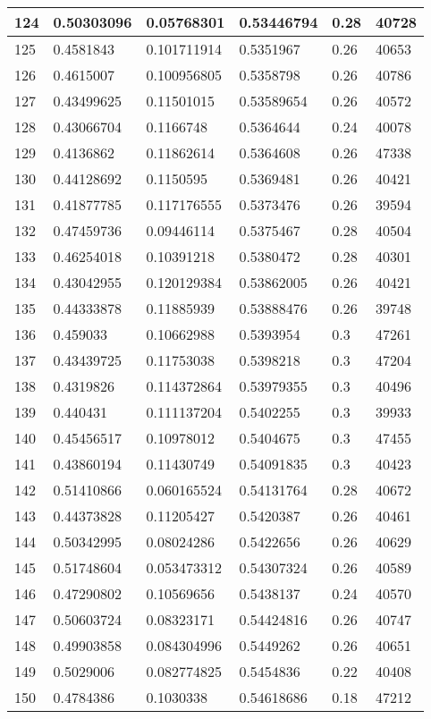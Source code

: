 \begin{longtable}{|l|l|l|l|l|l|}
124 & 0.50303096 & 0.05768301 & 0.53446794 & 0.28 & 40728 \\ \hline 
125 & 0.4581843 & 0.101711914 & 0.5351967 & 0.26 & 40653 \\ \hline 
126 & 0.4615007 & 0.100956805 & 0.5358798 & 0.26 & 40786 \\ \hline 
127 & 0.43499625 & 0.11501015 & 0.53589654 & 0.26 & 40572 \\ \hline 
128 & 0.43066704 & 0.1166748 & 0.5364644 & 0.24 & 40078 \\ \hline 
129 & 0.4136862 & 0.11862614 & 0.5364608 & 0.26 & 47338 \\ \hline 
130 & 0.44128692 & 0.1150595 & 0.5369481 & 0.26 & 40421 \\ \hline 
131 & 0.41877785 & 0.117176555 & 0.5373476 & 0.26 & 39594 \\ \hline 
132 & 0.47459736 & 0.09446114 & 0.5375467 & 0.28 & 40504 \\ \hline 
133 & 0.46254018 & 0.10391218 & 0.5380472 & 0.28 & 40301 \\ \hline 
134 & 0.43042955 & 0.120129384 & 0.53862005 & 0.26 & 40421 \\ \hline 
135 & 0.44333878 & 0.11885939 & 0.53888476 & 0.26 & 39748 \\ \hline 
136 & 0.459033 & 0.10662988 & 0.5393954 & 0.3 & 47261 \\ \hline 
137 & 0.43439725 & 0.11753038 & 0.5398218 & 0.3 & 47204 \\ \hline 
138 & 0.4319826 & 0.114372864 & 0.53979355 & 0.3 & 40496 \\ \hline 
139 & 0.440431 & 0.111137204 & 0.5402255 & 0.3 & 39933 \\ \hline 
140 & 0.45456517 & 0.10978012 & 0.5404675 & 0.3 & 47455 \\ \hline 
141 & 0.43860194 & 0.11430749 & 0.54091835 & 0.3 & 40423 \\ \hline 
142 & 0.51410866 & 0.060165524 & 0.54131764 & 0.28 & 40672 \\ \hline 
143 & 0.44373828 & 0.11205427 & 0.5420387 & 0.26 & 40461 \\ \hline 
144 & 0.50342995 & 0.08024286 & 0.5422656 & 0.26 & 40629 \\ \hline 
145 & 0.51748604 & 0.053473312 & 0.54307324 & 0.26 & 40589 \\ \hline 
146 & 0.47290802 & 0.10569656 & 0.5438137 & 0.24 & 40570 \\ \hline 
147 & 0.50603724 & 0.08323171 & 0.54424816 & 0.26 & 40747 \\ \hline 
148 & 0.49903858 & 0.084304996 & 0.5449262 & 0.26 & 40651 \\ \hline 
149 & 0.5029006 & 0.082774825 & 0.5454836 & 0.22 & 40408 \\ \hline 
150 & 0.4784386 & 0.1030338 & 0.54618686 & 0.18 & 47212 \\ \hline 
\end{longtable}